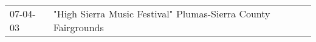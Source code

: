 \begin{supertabular}{p{0.25\columnwidth}p{0.75\columnwidth}}
 07-04-03 &  "High Sierra Music Festival" Plumas-Sierra County Fairgrounds \\
\end{supertabular}
